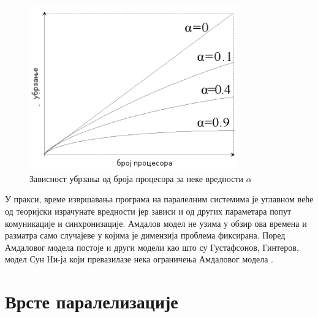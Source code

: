 \documentclass[12pt,oneside]{memoir}
\begin{document}
 \begin{figure}[!ht]
  \centering
  \includegraphics[width=0.8\textwidth]{amdal.png}
  \caption{Зависност убрзања од броја процесора за неке вредности $ \alpha $ }
  \label{fig:amdal}
\end{figure}


 \indent У пракси, време извршавања програма на паралелним системима је углавном веће од теоријски израчунате вредности јер зависи и од других параметара попут комуникације и синхронизације. Амдалов модел не узима у обзир ова времена и разматра само случајеве у којима је димензија проблема фиксирана. Поред Амдаловог модела постоје и други модели као што су Густафсонов, Гинтеров, модел Сун Ни-ја који превазилазе нека ограничења Амдаловог модела \cite{performance}.
 	 


  \section{Врсте паралелизације}
  
\end{document}
